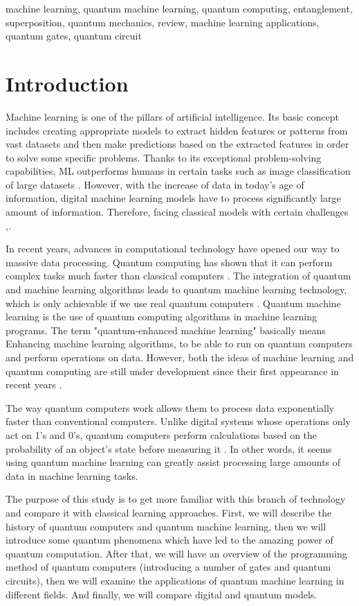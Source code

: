 \documentclass[conference]{IEEEtran}
\begin{document}
\begin{IEEEkeywords}
machine learning, quantum machine learning, quantum computing, entanglement, superposition, quantum mechanics, review, machine learning applications, quantum gates, quantum circuit
\end{IEEEkeywords}

\section{Introduction}
Machine learning is one of the pillars of artificial intelligence. Its basic concept includes creating appropriate models to extract hidden features or patterns from vast datasets and then make predictions based on the extracted features in order to solve some specific problems. Thanks to its exceptional problem-solving capabilities, ML outperforms humans in certain tasks such as image classification of large datasets \cite{b1}. However, with the increase of data in today's age of information, digital machine learning models have to process significantly large amount of information. Therefore, facing classical models with certain challenges \cite{b2},\cite{b3}. 

In recent years, advances in computational technology have opened our way to massive data processing. Quantum computing has shown that it can perform complex tasks much faster than classical computers \cite{b4}. The integration of quantum and machine learning algorithms leads to quantum machine learning technology, which is only achievable if we use real quantum computers \cite{b2}. Quantum machine learning is the use of quantum computing algorithms in machine learning programs. The term "quantum-enhanced machine learning" basically means Enhancing machine learning algorithms, to be able to run on quantum computers and perform operations on data. However, both the ideas of machine learning and quantum computing are still under development since their first appearance in recent years \cite{b5}. 

The way quantum computers work allows them to process data exponentially faster than conventional computers. Unlike digital systems whose operations only act on 1’s and 0’s, quantum computers perform calculations based on the probability of an object's state before measuring it \cite{b5}. In other words, it seems using quantum machine learning can greatly assist processing large amounts of data in machine learning tasks.

The purpose of this study is to get more familiar with this branch of technology and compare it with classical learning approaches. First, we will describe the history of quantum computers and quantum machine learning, then we will introduce some quantum phenomena which have led to the amazing power of quantum computation. After that, we will have an overview of the programming method of quantum computers (introducing a number of gates and quantum circuits), then we will examine the applications of quantum machine learning in different fields. And finally, we will compare digital and quantum models.
\end{document}
